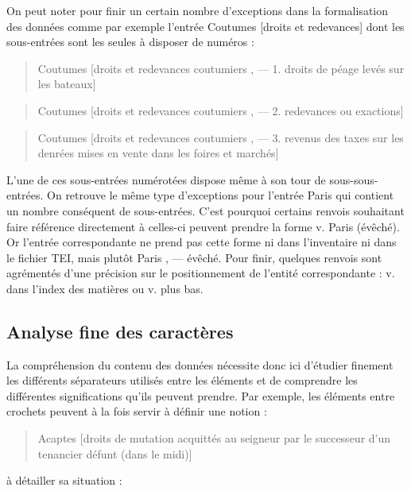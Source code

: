 \documentclass[a4paper,12pt,twoside]{book}
\begin{document}
	On peut noter pour finir un certain nombre d'exceptions dans la formalisation des données comme par exemple l'entrée \og Coutumes [droits et redevances]\fg{} dont les sous-entrées sont les seules à disposer de numéros :
	
	\begin{quotation}
		Coutumes [droits et redevances coutumiers , — 1. droits de péage levés sur
			les bateaux]
	\end{quotation}

	\begin{quotation}
		Coutumes [droits et redevances coutumiers , — 2. redevances ou exactions]
	\end{quotation}
	
	\begin{quotation}
		Coutumes [droits et redevances coutumiers , — 3. revenus des taxes sur les denrées mises en vente dans les foires et marchés]
	\end{quotation}

	\noindent L'une de ces sous-entrées numérotées dispose même à son tour de sous-sous-entrées. On retrouve le même type d'exceptions pour l'entrée \og Paris\fg{} qui contient un nombre conséquent de sous-entrées. C'est pourquoi certains renvois souhaitant faire référence directement à celles-ci peuvent prendre la forme \og v. Paris (évêché)\fg{}. Or l'entrée correspondante ne prend pas cette forme ni dans l'inventaire ni dans le fichier TEI, mais plutôt \og Paris , — évêché\fg{}. Pour finir, quelques renvois sont agrémentés d'une précision sur le positionnement de l'entité correspondante : \og v. dans l’index des matières\fg{} ou \og v. plus bas\fg{}.
	
	\subsection{Analyse fine des caractères}
	
	La compréhension du contenu des données nécessite donc ici d'étudier finement les différents séparateurs utilisés entre les éléments et de comprendre les différentes significations qu'ils peuvent prendre. Par exemple, les éléments entre crochets peuvent à la fois servir à définir une notion :
	
	\begin{quotation}
		Acaptes [droits de mutation acquittés au seigneur par le successeur d'un
			tenancier défunt (dans le midi)]
	\end{quotation}

	\noindent à détailler sa situation :
\end{document}
